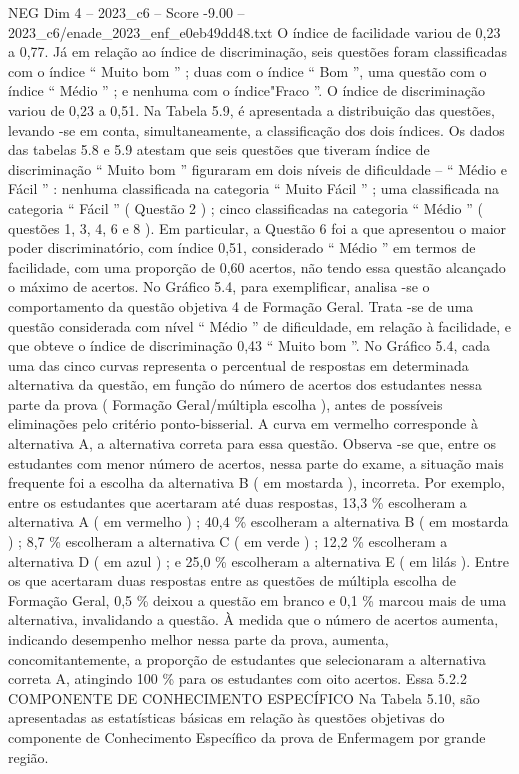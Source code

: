 \begin{textsample}{NEG Dim 4 – 2023\_c6 – Score -9.00 – 2023\_c6/enade\_2023\_enf\_e0eb49dd48.txt}
O índice de facilidade variou de 0,23 a 0,77.
Já em relação ao índice de discriminação, seis questões foram classificadas com o índice “ Muito bom ” ; duas com o índice “ Bom ”, uma questão com o índice “ Médio ” ; e nenhuma com o índice"Fraco ”.
O índice de discriminação variou de 0,23 a 0,51.
Na Tabela 5.9, é apresentada a distribuição das questões, levando -se em conta, simultaneamente, a classificação dos dois índices.
Os dados das tabelas 5.8 e 5.9 atestam que seis questões que tiveram índice de discriminação “ Muito bom ” figuraram em dois níveis de dificuldade – “ Médio e Fácil ” : nenhuma classificada na categoria “ Muito Fácil ” ; uma classificada na categoria “ Fácil ” ( Questão 2 ) ; cinco classificadas na categoria “ Médio ” ( questões 1, 3, 4, 6 e 8 ).
Em particular, a Questão 6 foi a que apresentou o maior poder discriminatório, com índice 0,51, considerado “ Médio ” em termos de facilidade, com uma proporção de 0,60 acertos, não tendo essa questão alcançado o máximo de acertos.
No Gráfico 5.4, para exemplificar, analisa -se o comportamento da questão objetiva 4 de Formação Geral.
Trata -se de uma questão considerada com nível “ Médio ” de dificuldade, em relação à facilidade, e que obteve o índice de discriminação 0,43 “ Muito bom ”.
No Gráfico 5.4, cada uma das cinco curvas representa o percentual de respostas em determinada alternativa da questão, em função do número de acertos dos estudantes nessa parte da prova ( Formação Geral/múltipla escolha ), antes de possíveis eliminações pelo critério ponto-bisserial.
A curva em vermelho corresponde à alternativa A, a alternativa correta para essa questão.
Observa -se que, entre os estudantes com menor número de acertos, nessa parte do exame, a situação mais frequente foi a escolha da alternativa B ( em mostarda ), incorreta.
Por exemplo, entre os estudantes que acertaram até duas respostas, 13,3 \% escolheram a alternativa A ( em vermelho ) ; 40,4 \% escolheram a alternativa B ( em mostarda ) ; 8,7 \% escolheram a alternativa C ( em verde ) ; 12,2 \% escolheram a alternativa D ( em azul ) ; e 25,0 \% escolheram a alternativa E ( em lilás ).
Entre os que acertaram duas respostas entre as questões de múltipla escolha de Formação Geral, 0,5 \% deixou a questão em branco e 0,1 \% marcou mais de uma alternativa, invalidando a questão.
À medida que o número de acertos aumenta, indicando desempenho melhor nessa parte da prova, aumenta, concomitantemente, a proporção de estudantes que selecionaram a alternativa correta A, atingindo 100 \% para os estudantes com oito acertos.
Essa 5.2.2 COMPONENTE DE CONHECIMENTO ESPECÍFICO Na Tabela 5.10, são apresentadas as estatísticas básicas em relação às questões objetivas do componente de Conhecimento Específico da prova de Enfermagem por grande região.

\end{textsample}
